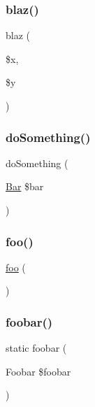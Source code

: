 \subsubsection{\texorpdfstring{blaz()}{blaz()}}
{\footnotesize\ttfamily blaz (\begin{DoxyParamCaption}\item[{}]{\$x,  }\item[{}]{\$y }\end{DoxyParamCaption})}

\mbox{\label{class_foo_af63f96af5b933414cb5150278f069fb8}} 
\subsubsection{\texorpdfstring{do\+Something()}{doSomething()}}
{\footnotesize\ttfamily do\+Something (\begin{DoxyParamCaption}\item[{\mbox{\hyperlink{class_bar}{Bar}}}]{\$bar }\end{DoxyParamCaption})}

\mbox{\label{class_foo_a79418a120498dd9cf915655654607747}} 
\subsubsection{\texorpdfstring{foo()}{foo()}}
{\footnotesize\ttfamily \mbox{\hyperlink{interfacefoo}{foo}} (\begin{DoxyParamCaption}{ }\end{DoxyParamCaption})}

\mbox{\label{class_foo_a89b46eec1742fecfdccad39d2a740179}} 
\subsubsection{\texorpdfstring{foobar()}{foobar()}}
{\footnotesize\ttfamily static foobar (\begin{DoxyParamCaption}\item[{Foobar}]{\$foobar }\end{DoxyParamCaption})\hspace{0.3cm}{\ttfamily [static]}}


